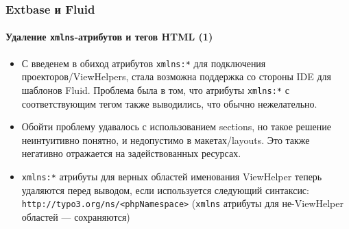 \begin{frame}[fragile]
	\frametitle{Extbase и Fluid}
	\framesubtitle{Удаление \texttt{xmlns}-атрибутов и тегов HTML (1)}

	\lstset{basicstyle=\tiny\ttfamily}

	\begin{itemize}

		\item С введенем в обиход атрибутов \texttt{xmlns:*} для подключения
			проекторов/ViewHelpers, стала возможна поддержка со стороны IDE для шаблонов Fluid.
			Проблема была в том, что атрибуты \texttt{xmlns:*} с соответствующим тегом
			также выводились, что обычно нежелательно.

		\item Обойти проблему удавалось с использованием  sections, но такое решение неинтуитивно понятно,
			и недопустимо в макетах/layouts. Это также негативно отражается на задействованных ресурсах.

		\item \texttt{xmlns:*} атрибуты для верных областей именования ViewHelper теперь удаляются перед выводом,
			если используется следующий синтаксис:
			\small\texttt{http://typo3.org/ns/<phpNamespace>}\normalsize\newline
			(\texttt{xmlns} атрибуты для не-ViewHelper областей — сохраняются)

	\end{itemize}

\end{frame}


